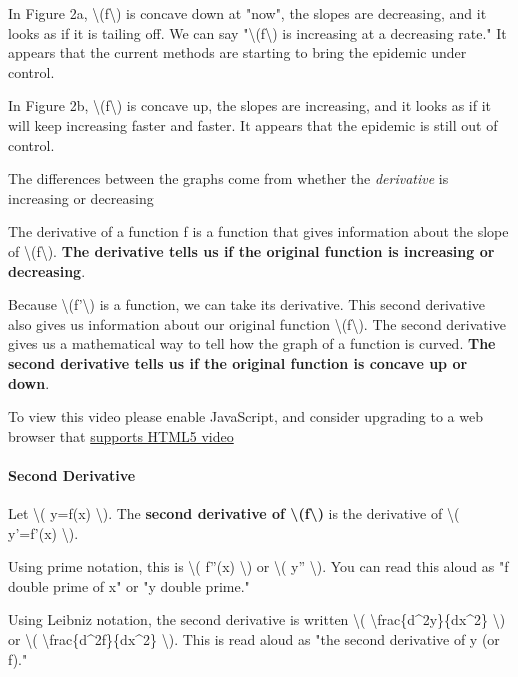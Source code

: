 In Figure 2a, \textbackslash{}(f\textbackslash{}) is concave down at
"now", the slopes are decreasing, and it looks as if it is tailing off.
We can say "\textbackslash{}(f\textbackslash{}) is increasing at a
decreasing rate." It appears that the current methods are starting to
bring the epidemic under control.

In Figure 2b, \textbackslash{}(f\textbackslash{}) is concave up, the
slopes are increasing, and it looks as if it will keep increasing faster
and faster. It appears that the epidemic is still out of control.

The differences between the graphs come from whether the
\emph{derivative} is increasing or decreasing

The derivative of a function f is a function that gives information
about the slope of \textbackslash{}(f\textbackslash{}). \textbf{The
derivative tells us if the original function is increasing or
decreasing}.

Because \textbackslash{}(f'\textbackslash{}) is a function, we can take
its derivative. This second derivative also gives us information about
our original function \textbackslash{}(f\textbackslash{}). The second
derivative gives us a mathematical way to tell how the graph of a
function is curved. \textbf{The second derivative tells us if the
original function is concave up or down}.

To view this video please enable JavaScript, and consider upgrading to a
web browser that \href{http://videojs.com/html5-video-support/}{supports
HTML5 video}

\hypertarget{second-derivative}{%
\paragraph{Second Derivative}\label{second-derivative}}

Let \textbackslash{}( y=f(x) \textbackslash{}). The \textbf{second
derivative of \textbackslash{}(f\textbackslash{})} is the derivative of
\textbackslash{}( y'=f'(x) \textbackslash{}).

Using prime notation, this is \textbackslash{}( f''(x) \textbackslash{})
or \textbackslash{}( y'' \textbackslash{}). You can read this aloud as
"f double prime of x" or "y double prime."

Using Leibniz notation, the second derivative is written
\textbackslash{}( \textbackslash{}frac\{d\^{}2y\}\{dx\^{}2\}
\textbackslash{}) or \textbackslash{}(
\textbackslash{}frac\{d\^{}2f\}\{dx\^{}2\} \textbackslash{}). This is
read aloud as "the second derivative of y (or f)."

